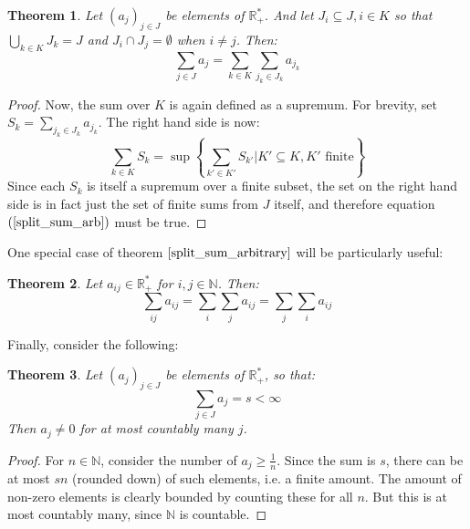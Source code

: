 \documentclass[12pt, a4paper]{article}
\newtheorem{theorem}{Theorem}[section]
\numberwithin{equation}{section}
\begin{document}
\begin{theorem}
\label{split_sum_arbitrary}
Let $(a_j)_{j\in J}$ be elements of $\mathbb{R}_+^*$. And let $J_i\subseteq J, i\in K$ so that $\bigcup_{k\in K} J_k=J$ and $J_i\cap J_j=\emptyset$ when $i\neq j$. Then:
\begin{equation}
\label{split_sum_arb}
\sum_{j\in J} a_j = \sum_{k\in K}\sum_{j_k\in J_k}a_{j_k}
\end{equation}
\end{theorem}
\begin{proof}
Now, the sum over $K$ is again defined as a supremum. For brevity, set $S_k=\sum_{j_k\in J_k}a_{j_k}$. The right hand side is now:
\begin{equation}
\sum_{k\in K}S_k=\sup\left\{\sum_{k'\in K'} S_{k'}|K'\subseteq K, K'\textrm{ finite}\right\}
\end{equation}
Since each $S_k$ is itself a supremum over a finite subset, the set on the right hand side is in fact just the set of finite sums from $J$ itself, and therefore equation $(\ref{split_sum_arb})$ must be true.
\end{proof}

One special case of theorem $\ref{split_sum_arbitrary}$ will be particularly useful:

\begin{theorem}
\label{switch_sum}
Let $a_{ij}\in\mathbb{R}_+^*$ for $i,j\in\mathbb{N}$. Then:
\begin{equation}
\sum_{ij}a_{ij}=\sum_i\sum_j a_{ij}=\sum_j\sum_i a_{ij}
\end{equation}
\end{theorem}

Finally, consider the following:
\begin{theorem}
\label{infinite_sum_finite}
Let $(a_j)_{j\in J}$ be elements of $\mathbb{R}_+^*$, so that:
\begin{equation}
\sum_{j\in J}a_j=s<\infty
\end{equation}
Then $a_j\neq 0$ for at most countably many $j$.
\end{theorem}
\begin{proof}
For $n\in\mathbb{N}$, consider the number of $a_j\ge\frac{1}{n}$. Since the sum is $s$, there can be at most $sn$ (rounded down) of such elements, i.e. a finite amount. The amount of non-zero elements is clearly bounded by counting these for all $n$. But this is at most countably many, since $\mathbb{N}$ is countable.
\end{proof}
\end{document}
